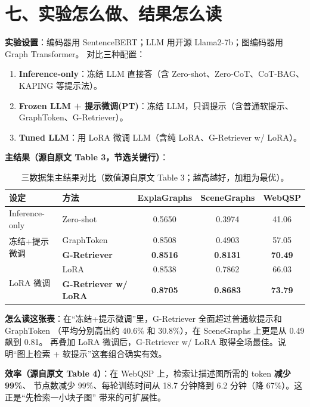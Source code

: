 \documentclass[11pt,UTF8,fontset=fandol]{ctexart}
\begin{document}
\section{七、实验怎么做、结果怎么读}

\textbf{实验设置}：编码器用 SentenceBERT；LLM 用开源 Llama2-7b；图编码器用 Graph Transformer。
对比三种配置：
\begin{enumerate}[leftmargin=2em]
  \item \textbf{Inference-only}：冻结 LLM 直接答（含 Zero-shot、Zero-CoT、CoT-BAG、KAPING 等提示法）。
  \item \textbf{Frozen LLM + 提示微调(PT)}：冻结 LLM，只调提示（含普通软提示、GraphToken、G-Retriever）。
  \item \textbf{Tuned LLM}：用 LoRA 微调 LLM（含纯 LoRA、G-Retriever w/ LoRA）。
\end{enumerate}

\textbf{主结果（源自原文 Table 3，节选关键行）}：

\begin{table}[H]\centering
\caption{三数据集主结果对比（数值源自原文 Table 3；越高越好，加粗为最优）。}
\begin{tabular}{llccc}
\toprule
设定 & 方法 & ExplaGraphs & SceneGraphs & WebQSP \\
\midrule
Inference-only & Zero-shot & 0.5650 & 0.3974 & 41.06 \\
\midrule
\multirow{2}{*}{冻结+提示微调}
 & GraphToken & 0.8508 & 0.4903 & 57.05 \\
 & \textbf{G-Retriever} & \textbf{0.8516} & \textbf{0.8131} & \textbf{70.49} \\
\midrule
\multirow{2}{*}{LoRA 微调}
 & LoRA & 0.8538 & 0.7862 & 66.03 \\
 & \textbf{G-Retriever w/ LoRA} & \textbf{0.8705} & \textbf{0.8683} & \textbf{73.79} \\
\bottomrule
\end{tabular}
\end{table}

\textbf{怎么读这张表}：在“冻结+提示微调”里，G-Retriever 全面超过普通软提示和 GraphToken
（平均分别高出约 40.6\% 和 30.8\%），在 SceneGraphs 上更是从 0.49 飙到 0.81。
再叠加 LoRA 微调后，G-Retriever w/ LoRA 取得全场最佳。说明“图上检索 + 软提示”这套组合确实有效。

\textbf{效率（源自原文 Table 4）}：在 WebQSP 上，检索让描述图所需的 token \textbf{减少 99\%}、
节点数减少 99\%、每轮训练时间从 18.7 分钟降到 6.2 分钟（降 67\%）。这正是“先检索一小块子图”
带来的可扩展性。
\end{document}
